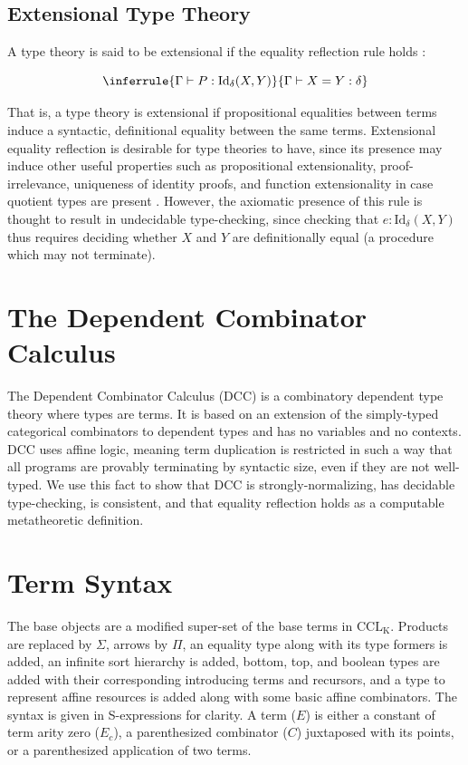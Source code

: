 \documentclass{lmcs}
\newcommand{\cclk}{\(\text{CCL}_\text{K}\)} %
\begin{document}
\subsection*{Extensional Type Theory}

A type theory is said to be extensional if the equality reflection rule holds \autocite[p. 16]{hofmann1995extensional}:

\[
  \inferrule
  { \Gamma \vdash P : \text{Id}_\delta(X, Y)}
  { \Gamma \vdash X = Y : \delta }
\]

That is, a type theory is extensional if propositional equalities between terms induce a syntactic, definitional equality between the same terms. Extensional equality reflection is desirable for type theories to have, since its presence may induce other useful properties such as propositional extensionality, proof-irrelevance, uniqueness of identity proofs, and function extensionality in case quotient types are present \autocite[18]{hofmann1995extensional}. However, the axiomatic presence of this rule is thought to result in undecidable type-checking, since checking that \(e : \text{Id}_\delta(X, Y)\) thus requires deciding whether \(X\) and \(Y\) are definitionally equal (a procedure which may not terminate).

\section*{The Dependent Combinator Calculus}\label{intro:dcc}

The Dependent Combinator Calculus (DCC) is a combinatory dependent type theory where types are terms. It is based on an extension of the simply-typed categorical combinators to dependent types and has no variables and no contexts. DCC uses affine logic, meaning term duplication is restricted in such a way that all programs are provably terminating by syntactic size, even if they are not well-typed. We use this fact to show that DCC is strongly-normalizing, has decidable type-checking, is consistent, and that equality reflection holds as a computable metatheoretic definition.

\section{Term Syntax}

The base objects are a modified super-set of the base terms in \cclk{}. Products are replaced by \(\Sigma\), arrows by \(\Pi\), an equality type along with its type formers is added, an infinite sort hierarchy is added, bottom, top, and boolean types are added with their corresponding introducing terms and recursors, and a type to represent affine resources is added along with some basic affine combinators. The syntax is given in S-expressions for clarity. A term (\(E\)) is either a constant of term arity zero (\(E_c\)), a parenthesized combinator (\(C\)) juxtaposed with its points, or a parenthesized application of two terms.
\end{document}
